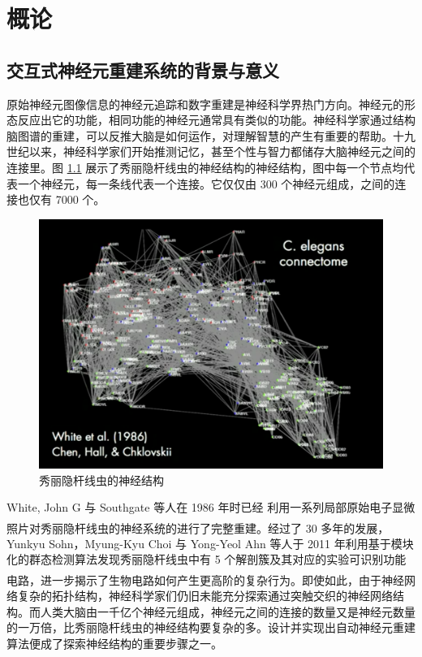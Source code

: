 \newcommand{\upcite}[1]{\textsuperscript{\textsuperscript{\cite{#1}}}}
\chapter{概论}
\section{交互式神经元重建系统的背景与意义}

原始神经元图像信息的神经元追踪和数字重建是神经科学界热门方向。神经元的形态反应出它的功能，相同功能的神经元通常具有类似的功能。神经科学家通过结构脑图谱的重建，可以反推大脑是如何运作，对理解智慧的产生有重要的帮助。十九世纪以来，神经科学家们开始推测记忆，甚至个性与智力都储存大脑神经元之间的连接里。图 \ref{worm} 展示了秀丽隐杆线虫的神经结构的神经结构，图中每一个节点均代表一个神经元，每一条线代表一个连接。它仅仅由 300 个神经元组成，之间的连接也仅有 7000 个。

\begin{figure}
\centering
\includegraphics{images/worm}
\caption{秀丽隐杆线虫的神经结构}
\label{worm}
\end{figure}

White, John G 与 Southgate 等人在 1986 年时已经 利用一系列局部原始电子显微照片对秀丽隐杆线虫的神经系统的进行了完整重建\upcite{white1986structure}。经过了 30 多年的发展，Yunkyu Sohn，Myung-Kyu Choi 与 Yong-Yeol Ahn 等人于 2011 年利用基于模块化的群态检测算法发现秀丽隐杆线虫中有 5 个解剖簇及其对应的实验可识别功能电路，进一步揭示了生物电路如何产生更高阶的复杂行为\upcite{varshney2011structural}。即使如此，由于神经网络复杂的拓扑结构，神经科学家们仍旧未能充分探索通过突触交织的神经网络结构。而人类大脑由一千亿个神经元组成，神经元之间的连接的数量又是神经元数量的一万倍，比秀丽隐杆线虫的神经结构要复杂的多。设计并实现出自动神经元重建算法便成了探索神经结构的重要步骤之一。


